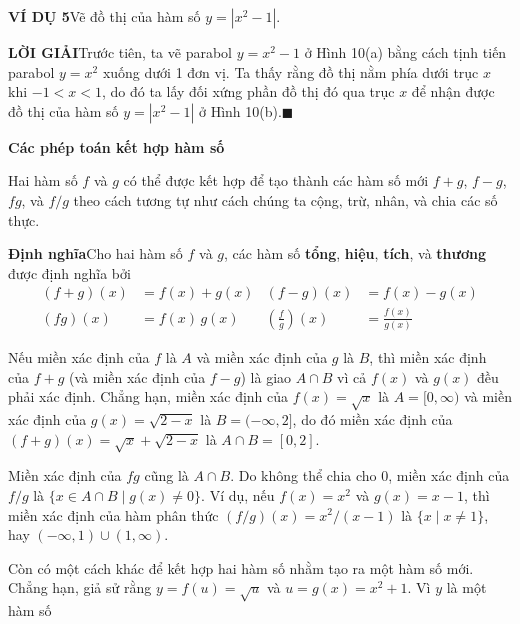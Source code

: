 \begin{minipage}[t]{0.708\textwidth}
    \vspace{0.8em}
    \noindent\textbf{\textsf{\color{stewartcyan}VÍ DỤ 5}}\quad Vẽ đồ thị của hàm số $y = |x^2 - 1|$.

    \vspace{0.3em}
    \noindent\textbf{\textsf{\color{stewartcyan}LỜI GIẢI}}\quad Trước tiên, ta vẽ parabol $y = x^2 - 1$ ở Hình 10(a) bằng cách tịnh tiến parabol $y = x^2$ xuống dưới 1 đơn vị. Ta thấy rằng đồ thị nằm phía dưới trục $x$ khi $-1 < x < 1$, do đó ta lấy đối xứng phần đồ thị đó qua trục $x$ để nhận được đồ thị của hàm số $y = |x^2 - 1|$ ở Hình 10(b).\hfill{\color{stewartcyan}$\blacksquare$}

    \vspace{1em}
    \noindent{\color{stewartcyan}\rule{1.2ex}{1.2ex}}\hspace{0.5em}\textbf{\textsf{\large Các phép toán kết hợp hàm số}}

    \vspace{0.4em}
    Hai hàm số $f$ và $g$ có thể được kết hợp để tạo thành các hàm số mới $f + g$, $f - g$, $fg$, và $f/g$ theo cách tương tự như cách chúng ta cộng, trừ, nhân, và chia các số thực.

    \vspace{0.6em}
    \begin{definitionbox}
        \textbf{\textsf{\color{stewartred}Định nghĩa}}\quad Cho hai hàm số $f$ và $g$, các hàm số \textbf{tổng}, \textbf{hiệu}, \textbf{tích}, và \textbf{thương} được định nghĩa bởi
        \begin{align*}
        (f + g)(x) &= f(x) + g(x) & (f - g)(x) &= f(x) - g(x) \\[4pt]
        (fg)(x) &= f(x)\,g(x) & \left(\frac{f}{g}\right)(x) &= \frac{f(x)}{g(x)}
        \end{align*}
    \end{definitionbox}

    \vspace{0.6em}
    Nếu miền xác định của $f$ là $A$ và miền xác định của $g$ là $B$, thì miền xác định của $f + g$ (và miền xác định của $f - g$) là giao $A \cap B$ vì cả $f(x)$ và $g(x)$ đều phải xác định. Chẳng hạn, miền xác định của $f(x) = \sqrt{x}$ là $A = [0, \infty)$ và miền xác định của $g(x) = \sqrt{2 - x}$ là $B = (-\infty, 2]$, do đó miền xác định của $(f + g)(x) = \sqrt{x} + \sqrt{2 - x}$ là $A \cap B = [0, 2]$.

    Miền xác định của $fg$ cũng là $A \cap B$. Do không thể chia cho 0, miền xác định của $f/g$ là $\{x \in A \cap B \mid g(x) \neq 0\}$. Ví dụ, nếu $f(x) = x^2$ và $g(x) = x - 1$, thì miền xác định của hàm phân thức $(f/g)(x) = x^2/(x - 1)$ là $\{x \mid x \neq 1\}$, hay $(-\infty, 1) \cup (1, \infty)$.

    Còn có một cách khác để kết hợp hai hàm số nhằm tạo ra một hàm số mới. Chẳng hạn, giả sử rằng $y = f(u) = \sqrt{u}$ và $u = g(x) = x^2 + 1$. Vì $y$ là một hàm số
\end{minipage}